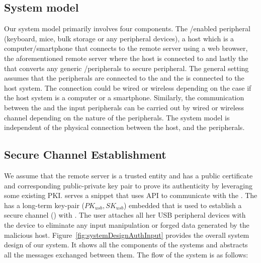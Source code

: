 \subsection{System model} 
\label{sec:inputPrivacy:systemModel}
Our system model primarily involves four components. The \usb/\bluetooth enabled peripheral (keyboard, mice, bulk storage or any peripheral devices), a host which is a computer/smartphone that connects to the remote server using a web browser, the aforementioned remote server where the host is connected to and lastly the \device that converts any generic \usb/\bluetooth peripherals to secure peripheral. The general setting assumes that the peripherals are connected to the \device and the \device is connected to the host system. The connection could be wired or wireless depending on the case if the host system is a computer or a smartphone. Similarly, the communication between the \device and the input peripherals can be carried out by wired or wireless channel depending on the nature of the peripherals. The system model is independent of the physical connection between the host, \device and the peripherals. 

\subsection{Secure Channel Establishment}
\label{sec:systemDesign:secureChannel}

We assume that the remote server \server is a trusted entity and has a public certificate and corresponding public-private key pair to prove its authenticity by leveraging some existing PKI. \server serves a \js snippet that uses \webusb API to communicate with the \device. The \device has a long-term key-pair ($PK_{usb}, SK_{usb}$) embedded that is used to establish a secure channel (\tls) with \server. The user attaches all her USB peripheral devices with the device to eliminate any input manipulation or forged data generated by the malicious host. Figure~\ref{fig:systemDesignAuthInput} provides the overall system design of our system. It shows all the components of the systems and abstracts all the messages exchanged between them. The flow of the system is as follows: 

\iffalse
\paragraph{Initialization} The user initializes the device by providing a domain name and coupling the credential corresponding to the domain. One such example is: the domain \server $=$ \texttt{xyz.com} and the credential \credential $=$ \texttt{(username, password)} where the tuple corresponds to the username and the password. The device uses a cryptographic hash  function to hash the credential and generates $\mathcal{H}_{\mathcal{S}} \leftarrow HASH$(\credential).
\fi

